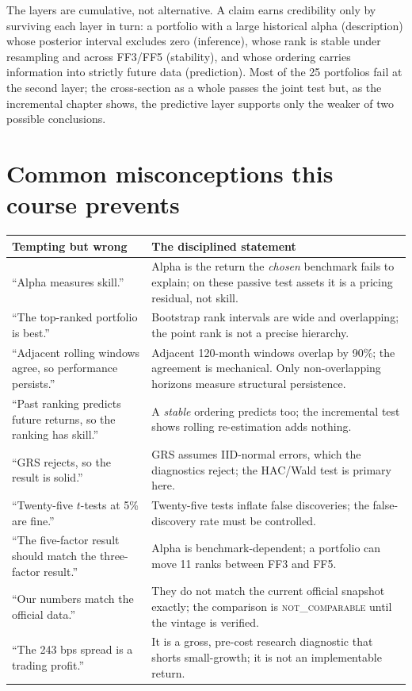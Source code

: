 The layers are cumulative, not alternative. A claim earns credibility
only by surviving each layer in turn: a portfolio with a large historical
alpha (description) whose posterior interval excludes zero (inference),
whose rank is stable under resampling and across FF3/FF5 (stability), and
whose ordering carries information into strictly future data
(prediction). Most of the 25 portfolios fail at the second layer; the
cross-section as a whole passes the joint test but, as the incremental
chapter shows, the predictive layer supports only the weaker of two
possible conclusions.

\hypertarget{common-misconceptions-this-course-prevents}{%
\section{Common misconceptions this course
prevents}\label{common-misconceptions-this-course-prevents}}

\begin{longtable}[]{@{}p{}p{}@{}}
\toprule\noalign{}
Tempting but wrong & The disciplined statement \\
\midrule\noalign{}
\endhead
\bottomrule\noalign{}
\endlastfoot
``Alpha measures skill.'' & Alpha is the return the \emph{chosen}
benchmark fails to explain; on these passive test assets it is a pricing
residual, not skill. \\
``The top-ranked portfolio is best.'' & Bootstrap rank intervals are wide
and overlapping; the point rank is not a precise hierarchy. \\
``Adjacent rolling windows agree, so performance persists.'' & Adjacent
120-month windows overlap by 90\%; the agreement is mechanical. Only
non-overlapping horizons measure structural persistence. \\
``Past ranking predicts future returns, so the ranking has skill.'' & A
\emph{stable} ordering predicts too; the incremental test shows rolling
re-estimation adds nothing. \\
``GRS rejects, so the result is solid.'' & GRS assumes IID-normal errors,
which the diagnostics reject; the HAC/Wald test is primary here. \\
``Twenty-five $t$-tests at 5\% are fine.'' & Twenty-five tests inflate
false discoveries; the false-discovery rate must be controlled. \\
``The five-factor result should match the three-factor result.'' & Alpha
is benchmark-dependent; a portfolio can move 11 ranks between FF3 and
FF5. \\
``Our numbers match the official data.'' & They do not match the current
official snapshot exactly; the comparison is \textsc{not\_comparable}
until the vintage is verified. \\
``The 243 bps spread is a trading profit.'' & It is a gross,
pre-cost research diagnostic that shorts small-growth; it is not an
implementable return. \\
\end{longtable}


